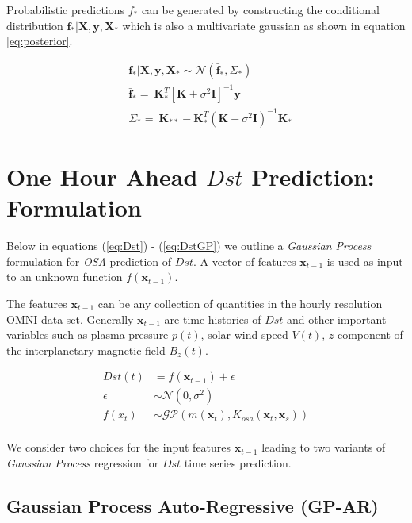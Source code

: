 \documentclass{article}
\begin{document}
Probabilistic predictions $f_*$ can be generated by constructing the conditional distribution $\mathbf{f_*}|\mathbf{X},\mathbf{y},\mathbf{X_*}$ which is also a multivariate gaussian as shown in equation \ref{eq:posterior}.

\begin{align}
    & \mathbf{f_*}|\mathbf{X},\mathbf{y},\mathbf{X_*} \sim \mathcal{N}(\mathbf{\bar{f}_*}, \Sigma_*)  \label{eq:posterior} \\
    & \mathbf{\bar{f}_*} =  \ \mathbf{K}^T_{*} [\mathbf{K} + \sigma^{2} \mathbf{I}]^{-1} \mathbf{y} \label{eq:posteriormean} \\
    & \Sigma_* = \ \mathbf{K}_{**} - \mathbf{K}^T_{*} \left(\mathbf{K} + \sigma^{2} \mathbf{I}\right)^{-1} \mathbf{K}_{*} \label{eq:posteriorcov}
\end{align}

\section{One Hour Ahead $Dst$ Prediction: Formulation} \label{sec:osa}

Below in equations (\ref{eq:Dst}) - (\ref{eq:DstGP}) we outline a \emph{Gaussian Process} formulation for \emph{OSA} prediction of $Dst$. A vector of features $\mathbf{x}_{t-1}$ is used as input to an unknown function $f(\mathbf{x}_{t-1})$.

The features $\mathbf{x}_{t-1}$ can be any collection of quantities in the hourly resolution OMNI data set. Generally $\mathbf{x}_{t-1}$ are time histories of $Dst$ and other important variables such as plasma pressure $p(t)$, solar wind speed $V(t)$, $z$ component of the interplanetary magnetic field $B_z(t)$.


\begin{align}
    Dst(t) & =  f(\mathbf{x}_{t-1}) + \epsilon \label{eq:Dst} \\
    \epsilon & \sim  \mathcal{N}(0, \sigma^2) \label{eq:GPNoise} \\
    f(x_t) & \sim  \mathcal{GP}(m(\mathbf{x}_t), K_{osa}(\mathbf{x}_t, \mathbf{x}_s)) \label{eq:DstGP} \\
\end{align}

We consider two choices for the input features $\mathbf{x}_{t-1}$ leading to two variants of \emph{Gaussian Process} regression for $Dst$ time series prediction.

\subsection{Gaussian Process Auto-Regressive (GP-AR)} \label{sec:gpar}
\end{document}
